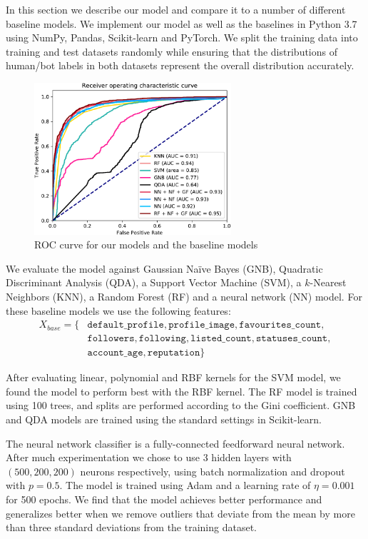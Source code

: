 In this section we describe our model and compare it to a number of different baseline models. We implement our model as well as the baselines in Python 3.7 using NumPy, Pandas, Scikit-learn and PyTorch. We split the training data into training and test datasets randomly while ensuring that the distributions of human/bot labels in both datasets represent the overall distribution accurately.

\begin{figure}
    \centering
    \includegraphics[width=0.65\textwidth]{FIG/roc-crop.pdf}
    \caption{ROC curve for our models and the baseline models}
    \label{fig:roc}
\end{figure}

We evaluate the model against Gaussian Naïve Bayes (GNB), Quadratic Discriminant Analysis (QDA), a Support Vector Machine (SVM), a $k$-Nearest Neighbors (KNN), a Random Forest (RF) and a neural network (NN) model. For these baseline models we use the following features:
\begin{align*}
    X_{base} = \{ & \texttt{default\_profile}, \texttt{profile\_image}, \texttt{favourites\_count}, \\
    & \texttt{followers}, \texttt{following}, \texttt{listed\_count}, \texttt{statuses\_count}, \\
    & \texttt{account\_age}, \texttt{reputation} \}
\end{align*}


After evaluating linear, polynomial and RBF kernels for the SVM model, we found the model to perform best with the RBF kernel. The RF model is trained using 100 trees, and splits are performed according to the Gini coefficient. GNB and QDA models are trained using the standard settings in Scikit-learn. 

The neural network classifier is a fully-connected feedforward neural network. After much experimentation we chose to use 3 hidden layers with $(500, 200, 200)$ neurons respectively, using batch normalization and dropout with $p=0.5$. The model is trained using Adam and a learning rate of $\eta = 0.001$ for 500 epochs. We find that the model achieves better performance and generalizes better when we remove outliers that deviate from the mean by more than three standard deviations from the training dataset.

